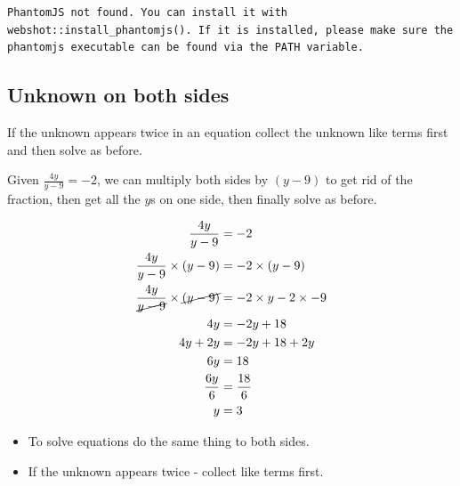 \documentclass[
  a4paper,
]{scrbook}
\providecommand{\tightlist}{%
  \setlength{\itemsep}{0pt}\setlength{\parskip}{0pt}}
\begin{document}
\begin{verbatim}
PhantomJS not found. You can install it with webshot::install_phantomjs(). If it is installed, please make sure the phantomjs executable can be found via the PATH variable.
\end{verbatim}

\subsection{Unknown on both sides}\label{unknown-on-both-sides}

If the unknown appears twice in an equation collect the unknown like
terms first and then solve as before.

Given \(\frac{4y}{y-9}=-2\), we can multiply both sides by \((y-9)\) to
get rid of the fraction, then get all the \(y\)s on one side, then
finally solve as before.

\[
\begin{aligned} \frac{4y}{y-9} &= -2 \\
\frac{4y}{y-9} \times (y-9) &= -2 \times (y-9) \\
\frac{4y}{\cancel{y-9}} \times \cancel{(y-9)} &= -2 \times y -2 \times -9 \\
4y &= -2y + 18 \\
4y + 2y &= -2y + 18 +2y\\
6y &= 18\\
\frac{6y}{6} &= \frac{18}{6}\\
y &= 3
\end{aligned}
\]

\begin{tcolorbox}[enhanced jigsaw, arc=.35mm, bottomrule=.15mm, bottomtitle=1mm, breakable, colback=white, colbacktitle=quarto-callout-note-color!10!white, colframe=quarto-callout-note-color-frame, coltitle=black, left=2mm, leftrule=.75mm, opacityback=0, opacitybacktitle=0.6, rightrule=.15mm, title=\textcolor{quarto-callout-note-color}{\faInfo}\hspace{0.5em}{Note}, titlerule=0mm, toprule=.15mm, toptitle=1mm]

\begin{itemize}
\tightlist
\item
  To solve equations do the same thing to both sides.
\item
  If the unknown appears twice - collect like terms first.
\end{itemize}

\end{tcolorbox}
\end{document}
